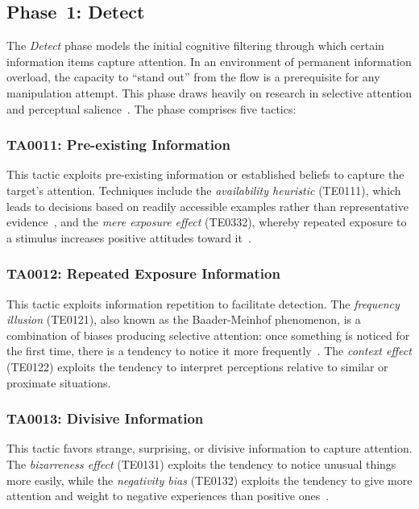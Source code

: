 \documentclass[11pt,a4paper]{article}
\begin{document}
\subsection{Phase~1: Detect}

The \textit{Detect} phase models the initial cognitive filtering through which certain information items capture attention. In an environment of permanent information overload, the capacity to ``stand out'' from the flow is a prerequisite for any manipulation attempt. This phase draws heavily on research in selective attention and perceptual salience~\cite{broadbent1958}. The phase comprises five tactics:

\subsubsection{TA0011: Pre-existing Information}
This tactic exploits pre-existing information or established beliefs to capture the target's attention. Techniques include the \textit{availability heuristic} (TE0111), which leads to decisions based on readily accessible examples rather than representative evidence~\cite{tversky1974}, and the \textit{mere exposure effect} (TE0332), whereby repeated exposure to a stimulus increases positive attitudes toward it~\cite{zajonc1968}.

\subsubsection{TA0012: Repeated Exposure Information}
This tactic exploits information repetition to facilitate detection. The \textit{frequency illusion} (TE0121), also known as the Baader-Meinhof phenomenon, is a combination of biases producing selective attention: once something is noticed for the first time, there is a tendency to notice it more frequently~\cite{zwicky2006}. The \textit{context effect} (TE0122) exploits the tendency to interpret perceptions relative to similar or proximate situations.

\subsubsection{TA0013: Divisive Information}
This tactic favors strange, surprising, or divisive information to capture attention. The \textit{bizarreness effect} (TE0131) exploits the tendency to notice unusual things more easily, while the \textit{negativity bias} (TE0132) exploits the tendency to give more attention and weight to negative experiences than positive ones~\cite{baumeister2001}.
\end{document}
